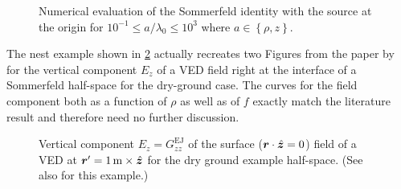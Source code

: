 \begin{figure}
    \caption[Numerical evaluation of the Sommerfeld identity]
    {Numerical evaluation of the Sommerfeld identity with the source at
    the origin for $10^{-1} \leq a / \lambda_0 \leq 10^{3}$ where
    $a \in \left\{ \rho, z \right\}$.}
    \label{fig:somm_id_ref_time}
\end{figure}




The nest example shown in \cref{fig:surface_E_z_of_rho_and_f_axial_transmission}
actually recreates two Figures from the paper by \textcite{Michalski2016b}
for the vertical component $E_z$ of a \ac{VED} field right at the interface
of a Sommerfeld half-space for the dry-ground case.
The curves for the field component both as a function of $\rho$ as well as of
$f$ exactly match the literature result and therefore need no further
discussion.

\begin{figure}
    \newcommand{\widthFactor}{0.47}
    \newcommand{\heightFactor}{0.35}
    \centering
        \caption[]{Vertical component $E_z = G^\mathrm{EJ}_{zz}$ of the surface
        ($\robs \cdot \uv{z} = 0$) field of a \ac{VED} at
        $\rsrc = \SI{1}{\metre} \times \uv{z}$ for the dry ground example
        half-space.
        (See also \textcite{Michalski2016b} for this example.)}
        \label{fig:surface_E_z_of_rho_and_f_axial_transmission}
\end{figure}






